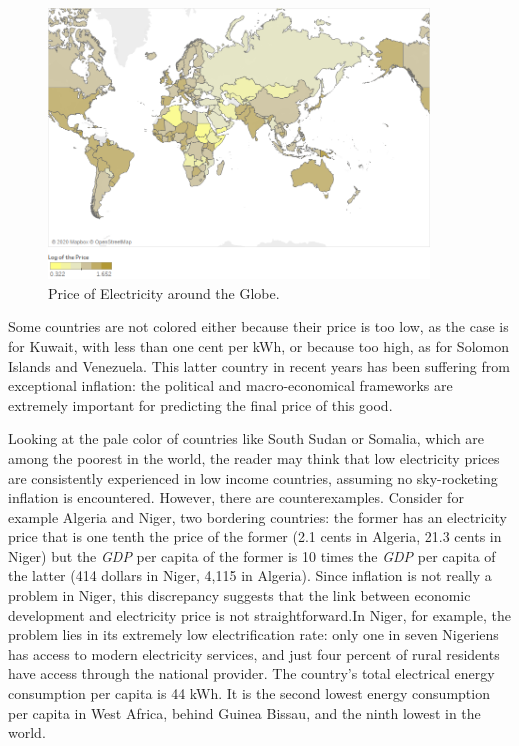 \documentclass[a4paper,12pt]{book}
\begin{document}
\begin{figure}[hbt]
\begin{center}
\includegraphics[width=0.9\textwidth]{Images/world2020.png}
\end{center}
\captionsetup{justification=centering}
\caption{Price of Electricity around the Globe.}
\label{fig:world_cost}
\end{figure}

Some countries are not colored either because their price is too low, as the case is for Kuwait, with less than one cent per kWh, or because too high, as for Solomon Islands and Venezuela. This latter country in recent years has been suffering from exceptional inflation: the political and macro-economical frameworks are extremely important for predicting the final price of this good.

Looking at the pale color of countries like South Sudan or Somalia, which are among the poorest in the world, the reader may think that low electricity prices are consistently experienced in low income countries, assuming no sky-rocketing inflation is encountered. However, there are counterexamples. Consider for example Algeria and Niger, two bordering countries: the former has an electricity price that is one tenth the price of the former (2.1 cents in Algeria, 21.3 cents in Niger) but the \textit{GDP} per capita of the former is 10 times the \textit{GDP} per capita of the latter (414 dollars in Niger, 4,115 in Algeria). Since inflation is not really a problem in Niger, this discrepancy suggests that the link between economic development and electricity price is not straightforward.In Niger, for example, the problem lies in its extremely low electrification rate: only one in seven Nigeriens has access to modern electricity services, and just four percent of rural residents have access through the national provider. The country's total electrical energy consumption per capita is 44 kWh. It is the second lowest energy consumption per capita in West Africa, behind Guinea Bissau, and the ninth lowest in the world.
\end{document}
